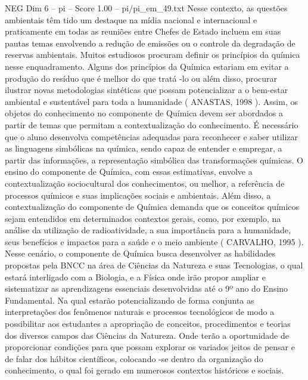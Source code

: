 \begin{textsample}{NEG Dim 6 – pi – Score 1.00 – pi/pi\_em\_49.txt}
Nesse contexto, as questões ambientais têm tido um destaque na mídia nacional e internacional e praticamente em todas as reuniões entre Chefes de Estado incluem em suas pautas temas envolvendo a redução de emissões ou o controle da degradação de reservas ambientais.
Muitos estudiosos procuram definir os princípios da química nesse enquadramento.
Alguns dos princípios da Química estariam em evitar a produção do resíduo que é melhor do que tratá -lo ou além disso, procurar ilustrar novas metodologias sintéticas que possam potencializar a o bem-estar ambiental e sustentável para toda a humanidade ( ANASTAS, 1998 ).
Assim, os objetos do conhecimento no componente de Química devem ser abordados a partir de temas que permitam a contextualização do conhecimento.
É necessário que o aluno desenvolva competências adequadas para reconhecer e saber utilizar as linguagens simbólicas na química, sendo capaz de entender e empregar, a partir das informações, a representação simbólica das transformações químicas.
O ensino do componente de Química, com essas estimativas, envolve a contextualização sociocultural dos conhecimentos, ou melhor, a referência de processos químicos e suas implicações sociais e ambientais.
Além disso, a contextualização do componente de Química demanda que os conceitos químicos sejam entendidos em determinados contextos gerais, como, por exemplo, na análise da utilização de radioatividade, a sua importância para a humanidade, seus benefícios e impactos para a saúde e o meio ambiente ( CARVALHO, 1995 ).
Nesse cenário, o componente de Química busca desenvolver as habilidades propostas pela BNCC na área de Ciências da Natureza e suas Tecnologias, o qual estará interligado com a Biologia, e a Física onde irão propor ampliar e sistematizar as aprendizagens essenciais desenvolvidas até o 9º ano do Ensino Fundamental.
Na qual estarão potencializando de forma conjunta as interpretações dos fenômenos naturais e processos tecnológicos de modo a possibilitar aos estudantes a apropriação de conceitos, procedimentos e teorias dos diversos campos das Ciências da Natureza.
Onde terão a oportunidade de proporcionar condições para que possam explorar os variados jeitos de pensar e de falar dos hábitos científicos, colocando -se dentro da organização do conhecimento, o qual foi gerado em numerosos contextos históricos e sociais.

\end{textsample}
